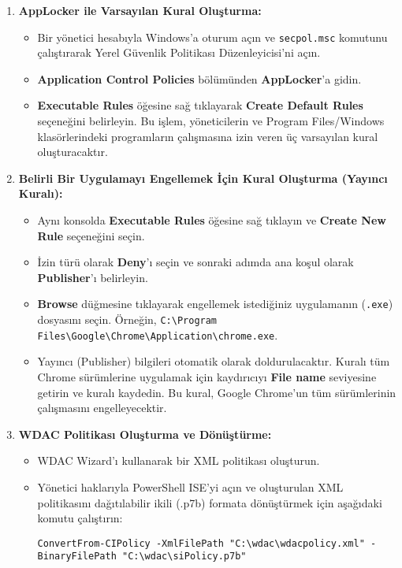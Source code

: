 \begin{enumerate}
    \item \textbf{AppLocker ile Varsayılan Kural Oluşturma:}
    \begin{itemize}
        \item Bir yönetici hesabıyla Windows'a oturum açın ve \texttt{secpol.msc} komutunu çalıştırarak Yerel Güvenlik Politikası Düzenleyicisi'ni açın.
        \item \textbf{Application Control Policies} bölümünden \textbf{AppLocker}'a gidin.
        \item \textbf{Executable Rules} öğesine sağ tıklayarak \textbf{Create Default Rules} seçeneğini belirleyin. Bu işlem, yöneticilerin ve Program Files/Windows klasörlerindeki programların çalışmasına izin veren üç varsayılan kural oluşturacaktır.
    \end{itemize}
    \item \textbf{Belirli Bir Uygulamayı Engellemek İçin Kural Oluşturma (Yayıncı Kuralı):}
    \begin{itemize}
        \item Aynı konsolda \textbf{Executable Rules} öğesine sağ tıklayın ve \textbf{Create New Rule} seçeneğini seçin.
        \item İzin türü olarak \textbf{Deny}'ı seçin ve sonraki adımda ana koşul olarak \textbf{Publisher}'ı belirleyin.
        \item \textbf{Browse} düğmesine tıklayarak engellemek istediğiniz uygulamanın (\texttt{.exe}) dosyasını seçin. Örneğin, \texttt{C:\textbackslash Program Files\textbackslash Google\textbackslash Chrome\textbackslash Application\textbackslash chrome.exe}.
        \item Yayıncı (Publisher) bilgileri otomatik olarak doldurulacaktır. Kuralı tüm Chrome sürümlerine uygulamak için kaydırıcıyı \textbf{File name} seviyesine getirin ve kuralı kaydedin. Bu kural, Google Chrome'un tüm sürümlerinin çalışmasını engelleyecektir.
    \end{itemize}
    \item \textbf{WDAC Politikası Oluşturma ve Dönüştürme:}
    \begin{itemize}
        \item WDAC Wizard'ı kullanarak bir XML politikası oluşturun.
        \item Yönetici haklarıyla PowerShell ISE'yi açın ve oluşturulan XML politikasını dağıtılabilir ikili (.p7b) formata dönüştürmek için aşağıdaki komutu çalıştırın:
        \begin{verbatim}
ConvertFrom-CIPolicy -XmlFilePath "C:\wdac\wdacpolicy.xml" -BinaryFilePath "C:\wdac\siPolicy.p7b"
        \end{verbatim}
    \end{itemize}
\end{enumerate}

